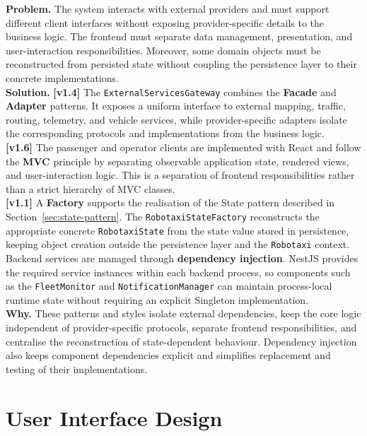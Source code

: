 \documentclass[11pt,a4paper,oneside]{report}
\newcommand{\code}[1]{\texttt{#1}}
\begin{document}
\textbf{Problem.}
The system interacts with external providers and must support different
client interfaces without exposing provider-specific details to the
business logic. The frontend must separate data management, presentation,
and user-interaction responsibilities. Moreover, some domain objects must
be reconstructed from persisted state without coupling the persistence
layer to their concrete implementations.\\
\textbf{Solution.}
\textbf{{[}v1.4{]}} The \code{ExternalServicesGateway} combines the
\textbf{Facade} and \textbf{Adapter} patterns. It exposes a uniform
interface to external mapping, traffic, routing, telemetry, and vehicle
services, while provider-specific adapters isolate the corresponding
protocols and implementations from the business logic.\\
\textbf{{[}v1.6{]}} The passenger and operator clients are implemented
with React and follow the \textbf{MVC} principle by separating observable
application state, rendered views, and user-interaction logic. This is a
separation of frontend responsibilities rather than a strict hierarchy of
MVC classes.\\
\textbf{{[}v1.1{]}} A \textbf{Factory} supports the realisation of the
State pattern described in Section~\ref{sec:state-pattern}. The
\code{RobotaxiStateFactory} reconstructs the appropriate concrete
\code{RobotaxiState} from the state value stored in persistence, keeping
object creation outside the persistence layer and the \code{Robotaxi}
context.\\
Backend services are managed through \textbf{dependency injection}.
NestJS provides the required service instances within each backend process,
so components such as the \code{FleetMonitor} and
\code{NotificationManager} can maintain process-local runtime state without
requiring an explicit Singleton implementation.\\
\textbf{Why.}
These patterns and styles isolate external dependencies, keep the core
logic independent of provider-specific protocols, separate frontend
responsibilities, and centralise the reconstruction of state-dependent
behaviour. Dependency injection also keeps component dependencies explicit
and simplifies replacement and testing of their implementations.

\hypertarget{user-interface-design}{%
\chapter{User Interface Design}\label{user-interface-design}}
\end{document}
